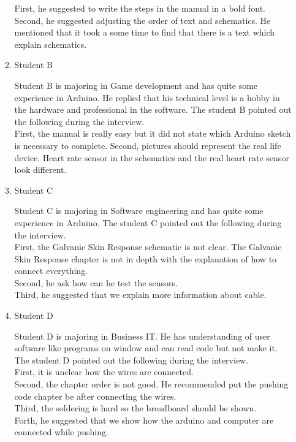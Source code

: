 \documentclass[conference]{IEEEtran}
\begin{document}
\begin{enumerate}
\begin{enumerate}
		First, he suggested to write the steps in the manual in a bold font.\\
		Second, he suggested adjusting the order of text and schematics. He mentioned that it took a some time to find that there is a text which explain schematics. 

\item Student B

Student B is majoring in Game development and has  quite some experience in Arduino. He replied that his technical level is a hobby in the hardware and professional in the software. The student B pointed out the following during the interview.\\

		First, the manual is really easy but it did not state which Arduino sketch is necessary to complete.
		Second, pictures should represent the real life device. Heart rate sensor in the schematics and the real heart rate sensor look different.

\item Student C

Student C is majoring in Software engineering and has  quite some experience in Arduino. The student C pointed out the following during the interview.\\

		First, the Galvanic Skin Response schematic is not clear. The Galvanic Skin Response chapter is not in depth with the explanation of how to connect everything.\\
		Second, he ask how can he test the sensors.\\
		Third, he suggested that we explain more information about cable.\\

\item Student D

Student D is majoring in Business IT. He has understanding of user software like programs on window and can read code but not make it. The student D pointed out the following during the interview.\\
	
	First, it is unclear how the wires are connected.\\
	Second, the chapter order is not good. He recommended put the pushing code chapter be after connecting the wires.\\
	Third, the soldering is hard so the breadboard should be shown.\\
	Forth, he suggested that we show how the arduino and computer are connected while pushing.\\
	

\end{enumerate}
\end{enumerate}
\end{document}
